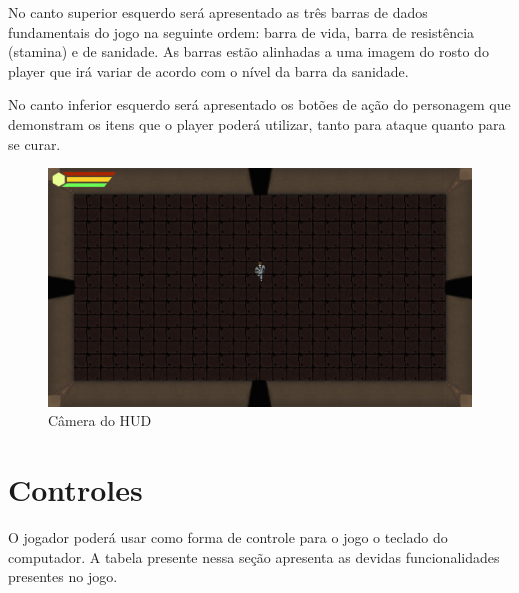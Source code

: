 No canto superior esquerdo será apresentado as três barras de dados fundamentais do jogo na seguinte ordem: barra de vida, barra de resistência (stamina) e de sanidade. As barras estão alinhadas a uma imagem do rosto do player que irá variar de acordo com o nível da barra da sanidade.

No canto inferior esquerdo será apresentado os botões de ação do personagem que demonstram os itens que o player poderá utilizar, tanto para ataque quanto para se curar.

\begin{figure}[!h]
    \label{hud}
    \centering
    \caption{Câmera do HUD}
    \includegraphics[keepaspectratio=true,scale=0.35]{images/HUD.jpg}
\end{figure}

\section{\label{ctrl} Controles}
O jogador poderá usar como forma de controle para o jogo o teclado do computador. A tabela presente nessa seção apresenta as devidas funcionalidades presentes no jogo.

